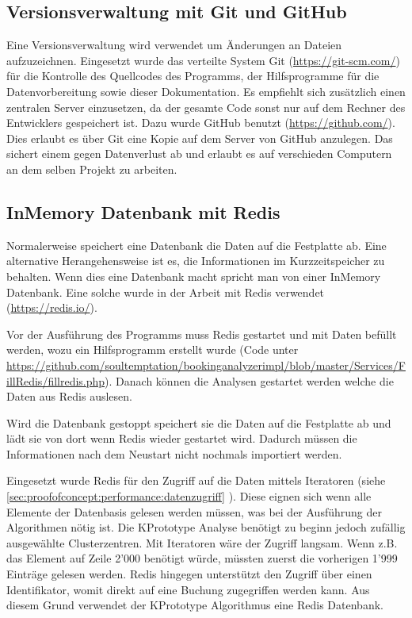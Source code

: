 \subsection{Versionsverwaltung mit Git und GitHub}
Eine Versionsverwaltung wird verwendet um Änderungen an Dateien aufzuzeichnen. Eingesetzt wurde das verteilte System Git (\url{https://git-scm.com/}) für die Kontrolle des Quellcodes des Programms, der Hilfsprogramme für die Datenvorbereitung sowie dieser Dokumentation. Es empfiehlt sich zusätzlich einen zentralen Server einzusetzen, da der gesamte Code sonst nur auf dem Rechner des Entwicklers gespeichert ist. Dazu wurde GitHub benutzt (\url{https://github.com/}). Dies erlaubt es über Git eine Kopie auf dem Server von GitHub anzulegen. Das sichert einem gegen Datenverlust ab und erlaubt es auf verschieden Computern an dem selben Projekt zu arbeiten.

\subsection{InMemory Datenbank mit Redis}
\label{sec:proofofconcept:externebibliotheken:redis}
Normalerweise speichert eine Datenbank die Daten auf die Festplatte ab. Eine alternative Herangehensweise ist es, die Informationen im Kurzzeitspeicher zu behalten. Wenn dies eine Datenbank macht spricht man von einer InMemory Datenbank. Eine solche wurde in der Arbeit mit Redis verwendet (\url{https://redis.io/}).

Vor der Ausführung des Programms muss Redis gestartet und mit Daten befüllt werden, wozu ein Hilfsprogramm erstellt wurde (Code unter \url{https://github.com/soultemptation/bookinganalyzerimpl/blob/master/Services/FillRedis/fillredis.php}). Danach können die Analysen gestartet werden welche die Daten aus Redis auslesen. 

Wird die Datenbank gestoppt speichert sie die Daten auf die Festplatte ab und lädt  sie von dort wenn Redis wieder gestartet wird. Dadurch müssen die Informationen nach dem Neustart nicht nochmals importiert werden.

Eingesetzt wurde Redis für den Zugriff auf die Daten mittels Iteratoren (siehe \cref{sec:proofofconcept:performance:datenzugriff} ). Diese eignen sich wenn alle Elemente der Datenbasis gelesen werden müssen, was bei der Ausführung der Algorithmen nötig ist. Die KPrototype Analyse benötigt zu beginn jedoch zufällig ausgewählte Clusterzentren. Mit Iteratoren wäre der Zugriff langsam. Wenn z.B. das Element auf Zeile 2'000 benötigt würde, müssten zuerst die vorherigen 1'999 Einträge gelesen werden. Redis hingegen unterstützt den Zugriff über einen Identifikator, womit direkt auf eine Buchung zugegriffen werden kann. Aus diesem Grund verwendet der KPrototype Algorithmus eine Redis Datenbank.



